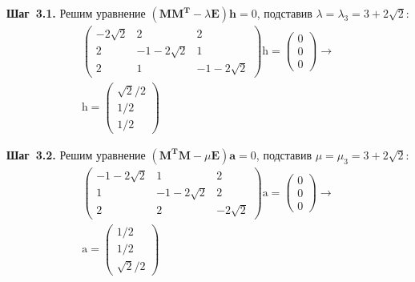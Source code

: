 \documentclass[class=article,crop=false]{standalone}
\begin{document}
\begin{multicols}{2}
        \noindent\textbf{Шаг~3.1.} Решим уравнение $\left(\mathbf{M M^T}-\lambda\mathbf{E}\right)\mathbf{h}=0$, подставив $\lambda=\lambda_3=3+2\sqrt{2}$:
        \begin{gather*}
            \begin{pmatrix}
                -2\sqrt{2} & 2            & 2            \\
                2          & -1-2\sqrt{2} & 1            \\
                2          & 1            & -1-2\sqrt{2}
            \end{pmatrix}\mathrm{h}=
            \begin{pmatrix}
                0 \\
                0 \\
                0
            \end{pmatrix}
            \longrightarrow\\
            \mathrm{h}=
            \begin{pmatrix}
                \sqrt{2}/2 \\
                1/2        \\
                1/2
            \end{pmatrix}
        \end{gather*}

        \noindent\textbf{Шаг~3.2.} Решим уравнение $\left(\mathbf{M^T M}-\mu\mathbf{E}\right)\mathbf{a}=0$, подставив $\mu=\mu_3=3+2\sqrt{2}$:
        \begin{gather*}
            \begin{pmatrix}
                -1-2\sqrt{2} & 1            & 2          \\
                1            & -1-2\sqrt{2} & 2          \\
                2            & 2            & -2\sqrt{2}
            \end{pmatrix}\mathrm{a}=
            \begin{pmatrix}
                0 \\
                0 \\
                0
            \end{pmatrix}
            \longrightarrow\\
            \mathrm{a}={
                \begin{pmatrix}
                    1/2 \\
                    1/2 \\
                    \sqrt{2}/2
                \end{pmatrix}
            }
        \end{gather*}
    \end{multicols}
\end{document}
